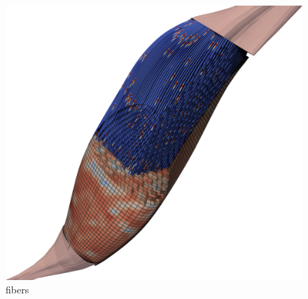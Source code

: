 \begin{figure}[H]
  \centering%
  \includegraphics[width=\textwidth]{images/parallel_fiber_estimation/muscle_meshes_raytrace.png}%
  \caption{fibers}%
  \label{fig:muscle_meshes_raytrace}%
\end{figure}


